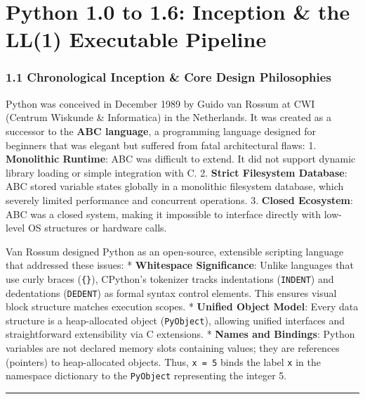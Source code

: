 \hypertarget{python-1.0-to-1.6-inception-the-ll1-executable-pipeline}{%
\chapter{Python 1.0 to 1.6: Inception \& the LL(1) Executable
Pipeline}\label{python-1.0-to-1.6-inception-the-ll1-executable-pipeline}}

\hypertarget{chronological-inception-core-design-philosophies}{%
\subsection{1.1 Chronological Inception \& Core Design
Philosophies}\label{chronological-inception-core-design-philosophies}}

Python was conceived in December 1989 by Guido van Rossum at CWI
(Centrum Wiskunde \& Informatica) in the Netherlands. It was created as
a successor to the \textbf{ABC language}, a programming language
designed for beginners that was elegant but suffered from fatal
architectural flaws: 1. \textbf{Monolithic Runtime}: ABC was difficult
to extend. It did not support dynamic library loading or simple
integration with C. 2. \textbf{Strict Filesystem Database}: ABC stored
variable states globally in a monolithic filesystem database, which
severely limited performance and concurrent operations. 3.
\textbf{Closed Ecosystem}: ABC was a closed system, making it impossible
to interface directly with low-level OS structures or hardware calls.

Van Rossum designed Python as an open-source, extensible scripting
language that addressed these issues: * \textbf{Whitespace
Significance}: Unlike languages that use curly braces
(\passthrough{\lstinline!\{\}!}), CPython's tokenizer tracks
indentations (\passthrough{\lstinline!INDENT!}) and dedentations
(\passthrough{\lstinline!DEDENT!}) as formal syntax control elements.
This ensures visual block structure matches execution scopes. *
\textbf{Unified Object Model}: Every data structure is a heap-allocated
object (\passthrough{\lstinline!PyObject!}), allowing unified interfaces
and straightforward extensibility via C extensions. * \textbf{Names and
Bindings}: Python variables are not declared memory slots containing
values; they are references (pointers) to heap-allocated objects. Thus,
\passthrough{\lstinline!x = 5!} binds the label
\passthrough{\lstinline!x!} in the namespace dictionary to the
\passthrough{\lstinline!PyObject!} representing the integer 5.

\begin{center}\rule{0.5\linewidth}{0.5pt}\end{center}

